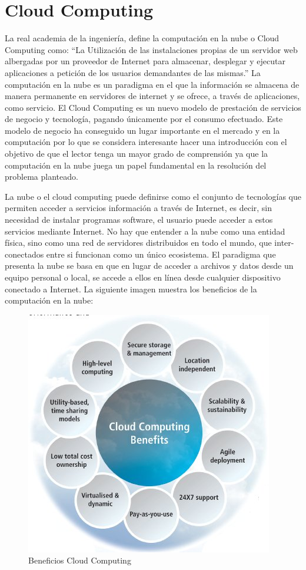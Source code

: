 \documentclass[a4paper,11pt]{book}
\begin{document}
\section{Cloud Computing}

La real academia de la ingeniería, define la computación en la nube o Cloud Computing\citep{realacademia}  como: “La Utilización de las instalaciones propias de un servidor web albergadas por un proveedor de Internet para almacenar, desplegar y ejecutar aplicaciones a petición de los usuarios demandantes de las mismas.” La computación en la nube es un paradigma en el que la información se almacena de manera permanente en servidores de internet y se ofrece, a través de aplicaciones, como servicio. El Cloud Computing es un nuevo modelo de prestación de servicios\cite{magazine} de negocio y tecnología, pagando únicamente por el consumo efectuado. Este modelo de negocio ha conseguido un lugar importante en el mercado y en la computación  por lo que se considera  interesante hacer una introducción con el objetivo de que el lector tenga un mayor grado de comprensión ya que la computación en la nube juega un papel fundamental en la resolución  del problema planteado.

La nube  o el cloud computing  puede definirse  como el conjunto de tecnologías que permiten acceder a servicios información a través de Internet, es decir, sin necesidad de instalar programas software, el usuario puede acceder a estos servicios mediante Internet. No hay que entender a la nube como una entidad física, sino como una red de servidores distribuidos en todo el mundo, que inter-conectados entre si funcionan como un único ecosistema.  El paradigma que presenta la nube se basa en que en lugar de acceder a archivos y datos desde un equipo personal o local, se accede a ellos en línea desde cualquier dispositivo conectado a Internet. La siguiente imagen muestra los beneficios de la computación en la nube:

\begin{figure}[H]
\centering
\includegraphics[scale=0.5]{imagenes/beneficiosCC.jpg}
\caption{ Beneficios Cloud Computing\cite{beneficios} }
\end{figure}
\end{document}
